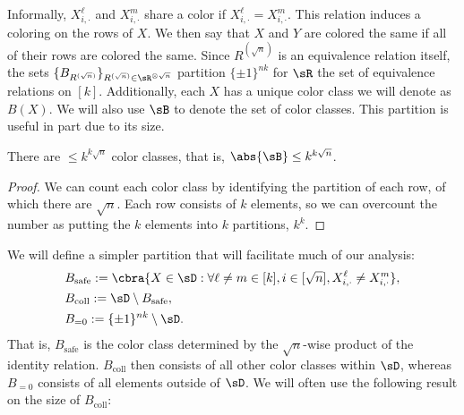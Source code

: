 Informally, $X^{\ell}_{i, \cdot}$ and $X^m_{i, \cdot}$ share a color if $X^{\ell}_{i, \cdot} = X^m_{i, \cdot}$. This relation induces a coloring on the rows of $X$. We then say that $X$ and $Y$ are colored the same if all of their rows are colored the same. Since $R^{(\sqrt{n})}$ is an equivalence relation itself, the sets $\{B_{R^{(\sqrt{n})}}\}_{R^{(\sqrt{n})} \in \sR^{\otimes \sqrt{n}}}$ partition $\{\pm1\}^{nk}$ for $\sR$ the set of equivalence relations on $[k]$. Additionally, each $X$ has a unique color class we will denote as $B(X)$. We will also use $\sB$ to denote the set of color classes. This partition is useful in part due to its size.
\begin{fact}
    \label{fact:numofcolorclasses}
    There are $\leq k^{k\sqrt{n}}$ color classes, that is, $\abs{\sB} \leq k^{k\sqrt{n}}$.
\end{fact}

\begin{proof}
    We can count each color class by identifying the partition of each row, of which there are $\sqrt{n}$. Each row consists of $k$ elements, so we can overcount the number as putting the $k$ elements into $k$ partitions, $k^k$.
\end{proof}

We will define a simpler partition that will facilitate much of our analysis:
\begin{align*}
    &B_\text{safe} := \cbra{X \in \sD : \forall \ell \neq  m \in [k], i \in [\sqrt{n}], X^\ell_{i, \cdot} \neq X^m_{i, \cdot}},\\
    &B_\text{coll} := \sD \setminus B_\text{safe},\\
    &B_{=0} := \{\pm1\}^{nk} \setminus \sD.
\end{align*}
That is, $B_\text{safe}$ is the color class determined by the $\sqrt{n}$-wise product of the identity relation. $B_\text{coll}$ then consists of all other color classes within $\sD$, whereas $B_{=0}$ consists of all elements outside of $\sD$. We will often use the following result on the size of $B_\text{coll}$:

